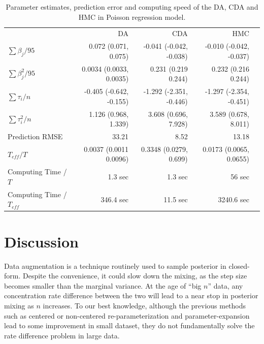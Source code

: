 \documentclass[10pt]{article}
\begin{document}
\begin{table}[H]
\centering
\begin{tabular}{|l |r |r| r| r |} 
 \hline
                          & DA & CDA & HMC\\
 [0.5ex]
$\sum \beta_j / 95$         & 0.072 (0.071, 0.075)&  -0.041 (-0.042, -0.038)  & -0.010 (-0.042, -0.037) \\
$\sum \beta_j^2 / 95$         & 0.0034 (0.0033, 0.0035)&  0.231 (0.219 0.244)  & 0.232 (0.216 0.244)   \\
$\sum\tau_i/n$         & -0.405 (-0.642, -0.155)&  -1.292 (-2.351, -0.446)  &  -1.297 (-2.354, -0.451)  \\
$\sum\tau_i^2/n$         & 1.126 (0.968, 1.339)&  3.608 (0.696, 7.928)  & 3.589 (0.678, 8.011)  \\
Prediction RMSE                           & 33.21        & 8.52          & 13.18\\
$T_{eff} / T$ & 0.0037 (0.0011 0.0096) & 0.3348 (0.0279, 0.699) &  0.0173 (0.0065, 0.0655) \\
Computing Time /  $T$  & 1.3 sec       & 1.3 sec        & 56 sec\\
Computing Time /  $T_{eff}$  & 346.4 sec       & 11.5 sec        & 3240.6 sec\\
 \hline
\end{tabular}
\caption{Parameter estimates, prediction error and computing speed of the DA, CDA and HMC in Poisson regression model.}
\label{table:Poisson}
\end{table}

\section{Discussion}
Data augmentation is a technique routinely used to sample posterior in closed-form. Despite the convenience, it could slow down the mixing, as the step size becomes smaller than the marginal variance. At the age of ``big $n$'' data, any concentration rate difference between the two will lead to a near stop in posterior mixing as $n$ increases. To our best knowledge, although the previous methods such as centered or non-centered re-parameterization \citep{papaspiliopoulos2007general} and parameter-expansion \citep{liu1999parameter} lead to some improvement in small dataset, they do not fundamentally solve the rate difference problem in large data.
\end{document}
